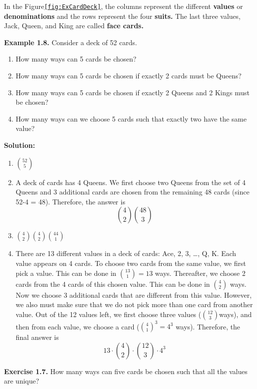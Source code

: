 \documentclass[
  12pt,
]{krantzNoCorner}
\providecommand{\tightlist}{%
  \setlength{\itemsep}{0pt}\setlength{\parskip}{0pt}}
\begin{document}
In the Figure\texttt{\ref{fig:ExCardDeck}}, the columns represent the different
\textbf{values} or \textbf{denominations} and the rows represent the four
\textbf{suits.} The last three values, Jack, Queen, and King are called
\textbf{face cards.}

\textbf{Example 1.8.} Consider a deck of 52 cards.

\begin{enumerate}
\def\labelenumi{\arabic{enumi}.}
\tightlist
\item
  How many ways can 5 cards be chosen?
\item
  How many ways can 5 cards be chosen if exactly 2 cards must be
  Queens?
\item
  How many ways can 5 cards be chosen if exactly 2 Queens and 2 Kings
  must be chosen?
\item
  How many ways can we choose 5 cards such that exactly two have the
  same value?
\end{enumerate}

\textbf{Solution:}

\begin{enumerate}
\def\labelenumi{\arabic{enumi}.}
\item
  \(\binom{52}{5}\)
\item
  A deck of cards has 4 Queens. We first choose two Queens from the
  set of 4 Queens and 3 additional cards are chosen from the remaining
  48 cards (since 52-4 = 48). Therefore, the answer is
  \[\binom{4}{2}\binom{48}{3}\]
\item
  \(\binom{4}{2}\binom{4}{2}\binom{44}{1}\)
\item
  There are 13 different values in a deck of cards: Ace, 2, 3, \ldots,
  Q, K. Each value appears on 4 cards. To choose two cards from the
  same value, we first pick a value. This can be done in
  \(\binom{13}{1}=13\) ways. Thereafter, we choose 2 cards from the 4
  cards of this chosen value. This can be done in \(\binom{4}{2}\) ways.
  Now we choose 3 additional cards that are different from this value.
  However, we also must make sure that we do not pick more than one
  card from another value. Out of the 12 values left, we first choose
  three values (\(\binom{12}{3}\)ways), and then from each value, we
  choose a card (\(\binom{4}{1}^3=4^3\) ways). Therefore, the final
  answer is \[13\cdot\binom{4}{2}\cdot \binom{12}{3}\cdot 4^3\]
\end{enumerate}

\textbf{Exercise 1.7.} How many ways can five cards be chosen such that all
the values are unique?
\end{document}

